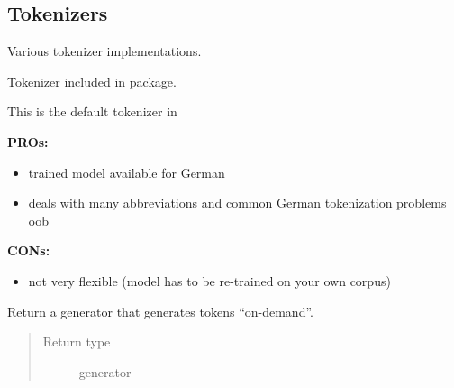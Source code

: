 \documentclass[letterpaper,10pt,english]{sphinxmanual}
\begin{document}
\subsection{Tokenizers}
\label{api_reference:tokenizers}\label{api_reference:module-textblob_de.tokenizers}
Various tokenizer implementations.

\begin{fulllineitems}
\label{api_reference:textblob_de.tokenizers.NLTKPunktTokenizer}
Tokenizer included in  package.

This is the default tokenizer in 

\textbf{PROs:}
\begin{itemize}
\item {} 
trained model available for German

\item {} 
deals with many abbreviations and common German tokenization problems oob

\end{itemize}

\textbf{CONs:}
\begin{itemize}
\item {} 
not very flexible (model has to be re-trained on your own corpus)

\end{itemize}

\begin{fulllineitems}
\label{api_reference:textblob_de.tokenizers.NLTKPunktTokenizer.itokenize}
Return a generator that generates tokens ``on-demand''.

\begin{quote}\begin{description}
\item[{Return type}] \leavevmode
generator

\end{description}\end{quote}

\end{fulllineitems}



\end{fulllineitems}
\end{document}
